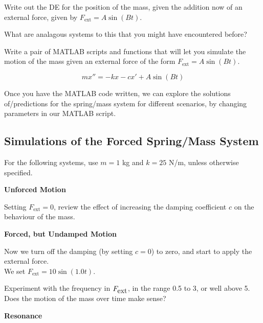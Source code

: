  \problem Write out the DE for the position of the mass, given the
 addition now of an external force, given by
 $F_{\mbox{ext}} = A \sin(Bt)$.  \vfill

What are analagous systems to this that you might have encountered
before?

\vfill

\newpage

\problem  Write a pair of MATLAB scripts and functions that will let you simulate
the motion of the mass given an external force of the form  
 $F_{\mbox{ext}} = A \sin(Bt)$.  

$$m x'' = -kx -c x' + A \sin(Bt)$$

\vfill

Once you have the MATLAB code written, we can explore the solutions
of/predictions for the spring/mass system for different scenarios, by
changing parameters in our MATLAB script.

\newpage

\subsection*{Simulations of the Forced Spring/Mass System}

For the following systems, use $m = 1$ kg and $k = 25$ N/m, unless
otherwise specified.

{\bf Unforced Motion}

\problem Setting $F_{\mbox{ext}} = 0$, review the effect of increasing
the damping coefficient $c$ on the behaviour of the mass.

\vfill

\newpage

{\bf Forced, but Undamped Motion}

Now we turn off the damping (by setting $c=0$) to zero, and
start to apply the external force. \\
We set $F_{\mbox{ext}} = 10 \sin(1.0 t)$.   \\

\vfill

Experiment with the frequency in $F_{\mbox{ext}}$, in the range 0.5 to 3, or well
above 5.  Does the motion of the mass over time make sense?

\vfill

\newpage


{\bf Resonance}

